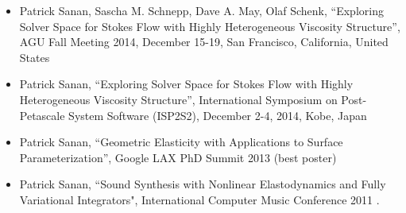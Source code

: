 \begin{itemize}
\item Patrick Sanan, Sascha M. Schnepp, Dave A. May, Olaf Schenk, ``Exploring Solver Space for Stokes Flow with Highly Heterogeneous Viscosity Structure'', AGU Fall Meeting 2014, December 15-19, San Francisco, California, United States
\item Patrick Sanan, ``Exploring Solver Space for Stokes Flow with Highly Heterogeneous Viscosity Structure'', International Symposium on Post-Petascale System Software (ISP2S2), December 2-4, 2014, Kobe, Japan
\item Patrick Sanan, ``Geometric Elasticity with Applications to Surface Parameterization'', Google LAX PhD Summit 2013 (best poster)
\item Patrick Sanan, ``Sound Synthesis with Nonlinear Elastodynamics and Fully Variational Integrators", International Computer Music Conference 2011 .
\end{itemize}

